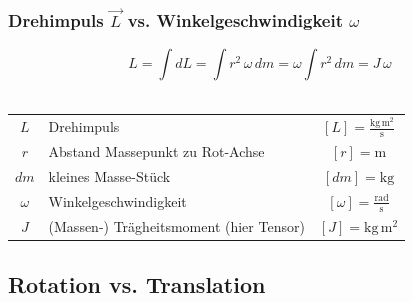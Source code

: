 		\subsubsection{Drehimpuls $\vec{L}$ vs. Winkelgeschwindigkeit $\omega$}

		$$ \boxed{ L = \int dL = \int r^2 \, \omega \, dm = \omega \int r^2 \, dm = J \, \omega }$$ \\
		
			\begin{tabular}{c l c}
				$L$ & Drehimpuls & $[L] = \mathrm{\frac{kg \, m^2}{s}}$ \\
				$r$ & Abstand Massepunkt zu Rot-Achse & $[r] = \mathrm{m}$ \\
				$dm$ & kleines Masse-Stück & $[dm] = \mathrm{kg}$ \\
				$\omega$ & Winkelgeschwindigkeit & $[\omega] = \mathrm{\frac{rad}{s}}$ \\
				$J$ & (Massen-) Trägheitsmoment (hier Tensor) & $[J] = \mathrm{kg \, m^2}$ \\
			\end{tabular}

	\subsection{Rotation vs. Translation}
	
